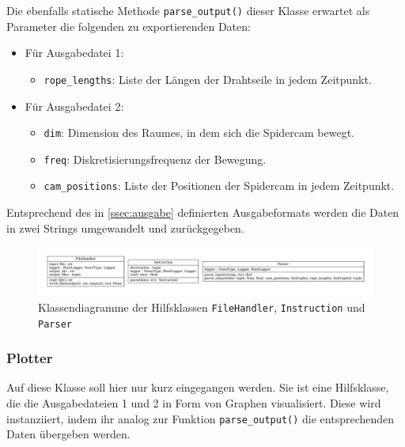 Die ebenfalls statische Methode \texttt{parse\_output()} dieser Klasse erwartet als Parameter die folgenden zu exportierenden Daten:
\begin{itemize}
    \item Für Ausgabedatei 1:
          \begin{itemize}
              \item \texttt{rope\_lengths}: Liste der Längen der Drahtseile in jedem Zeitpunkt.
          \end{itemize}
    \item Für Ausgabedatei 2:
          \begin{itemize}
              \item \texttt{dim}: Dimension des Raumes, in dem sich die Spidercam bewegt.
              \item \texttt{freq}: Diskretisierungsfrequenz der Bewegung.
              \item \texttt{cam\_positions}: Liste der Positionen der Spidercam in jedem Zeitpunkt.
          \end{itemize}
\end{itemize}

Entsprechend des in \ref{ssec:ausgabe} definierten Ausgabeformats werden die Daten in zwei Strings umgewandelt und zurückgegeben.

\begin{figure}[H]
    \centering
    \includegraphics[width=\textwidth]{../python/uml/io.pdf}
    \caption{Klassendiagramme der Hilfsklassen \texttt{FileHandler}, \texttt{Instruction} und \texttt{Parser}}
    \label{fig:io}
\end{figure}

\subsubsection{Plotter}
\label{ssec:plotter}

Auf diese Klasse soll hier nur kurz eingegangen werden.
Sie ist eine Hilfsklasse, die die Ausgabedateien 1 und 2 in Form von Graphen visualisiert.
Diese wird instanziiert, indem ihr analog zur Funktion \texttt{parse\_output()} die entsprechenden Daten übergeben werden.

